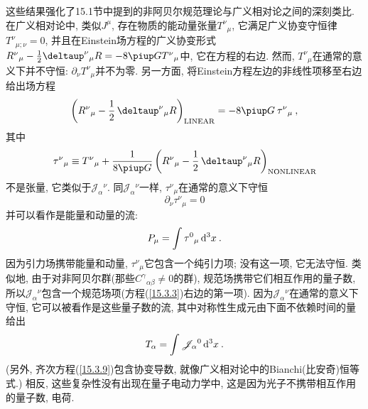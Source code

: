 这些结果强化了15.1节中提到的非阿贝尔规范理论与广义相对论之间的深刻类比. 在广义相对论中, 类似$J^{\mu}$, 存在物质的能动量张量$T^{\nu}{}_{\mu}$, 它满足广义协变守恒律$T^{\nu}{}_{\mu ; \nu}=0$, 并且在Einstein场方程的广义协变形式$R^{\nu}{}_{\mu}-\frac{1}{2} \deltaup^{\nu}{}_{\mu} R = -8 \uppi G T^{\nu}{}_{\mu }$中, 它在方程的右边. 然而, $T^{\nu}{}_{\mu}$在通常的意义下并不守恒: $\partial_{\nu}T^{\nu}{}_{\mu}$并不为零. 另一方面, 将Einstein方程左边的非线性项移至右边给出场方程\cite{8}
\[
\left( R^{\nu}{}_{\mu} - \frac{1}{2}\, \deltaup^{\nu}{}_{\mu} R \right)_{\text{LINEAR}} = -8 \uppi  G \: \tau^{\nu}{}_{\mu} \:, 
\]
其中
\[
\tau^{\nu}{}_{\mu} \equiv T^{\nu}{}_{\mu} + \frac{1}{8\uppi G}\left( R^{\nu}{}_{\mu} - \frac{1}{2}\, \deltaup^{\nu}{}_{\mu} R \right)_{\text{NONLINEAR}} 
\]
不是张量, 它类似于$\mathscr{J}_{\alpha}{}^{\nu}$. 同$\mathscr{J}_{\alpha}{}^{\nu}$一样, $\tau^{\nu}{}_{\mu}$在通常的意义下守恒
\[
\partial_{\nu} \tau^{\nu}{}_{\mu} = 0
\]
并可以看作是能量和动量的流:
\[
P_{\mu} = \int \tau^{0}{}_{\mu} \, \mathrm{d}^{3}x \:. 
\]
因为引力场携带能量和动量, $\tau^{\nu}{}_{\mu}$它包含一个纯引力项; 没有这一项, 它无法守恒. 类似地, 由于对非阿贝尔群(那些$C^{\gamma}{}_{\alpha\beta} \neq 0$的群), 规范场携带它们相互作用的量子数, 所以$\mathscr{J}_{\alpha}{}^{\nu}$包含一个规范场项(方程(\ref{15.3.3})右边的第一项). 因为$\mathscr{J}_{\alpha}{}^{\nu}$在通常的意义下守恒, 它可以被看作是这些量子数的流, 其中对称性生成元由下面不依赖时间的量给出
\begin{equation}
T_{\alpha} = \int \mathscr{J}_{\alpha}{}^{0}\, \mathrm{d}^{3}x \:.  \label{15.3.10}
\end{equation}
(另外, 齐次方程(\ref{15.3.9})包含协变导数, 就像广义相对论中的Bianchi(比安奇)恒等式.) 相反, 这些复杂性没有出现在量子电动力学中, 这是因为光子不携带相互作用的量子数, 电荷.

